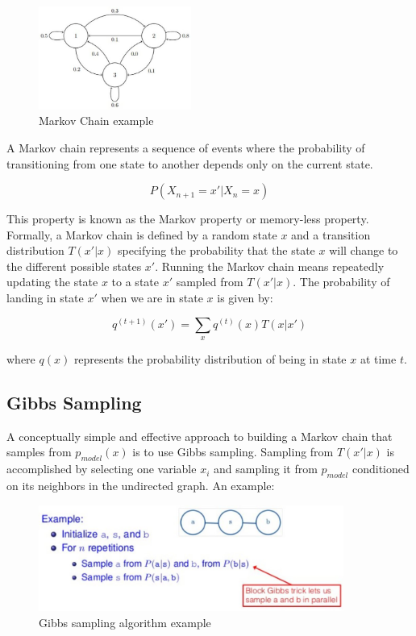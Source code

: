 \begin{figure}[h]
    \centering
    \includegraphics[width=5cm]{Images/markov-chain.jpg}
    \caption{Markov Chain example}
    \label{fig:markov-chain}
\end{figure}


\noindent A Markov chain represents a sequence of events where the probability of transitioning from one state to another depends only on the current state.

$$ P(X_{n+1}=x' \vert X_n = x) $$

\noindent This property is known as the Markov property or memory-less property. Formally, a Markov chain is defined by a random state $x$ and a transition distribution $T ( x' | x)$ specifying the probability that the state $x$ will change to the different possible states $x'$. Running the Markov chain means repeatedly updating the state $x$ to a state $x'$ sampled from $T(x'|x)$. The probability of landing in state $x'$ when we are in state $x$ is given by:

$$ q^{(t+1)} (x') = \sum_x q^{(t)} (x) T(x | x')  $$

where $q(x)$ represents the probability distribution of being in state $x$ at time $t$.


\subsection{Gibbs Sampling}

A conceptually simple and effective approach to building a Markov chain that samples from $p_{model}(x)$ is to use Gibbs sampling. Sampling from $T(x'|x)$ is accomplished by selecting one variable $x_i$ and sampling it from $p_{model}$
conditioned on its neighbors in the undirected graph. An example:

\begin{figure}[h]
    \centering
    \includegraphics[width=10cm]{Images/gibbs-sampling.jpg}
    \caption{Gibbs sampling algorithm example}
    \label{fig:gibbs-sampling}
\end{figure}

